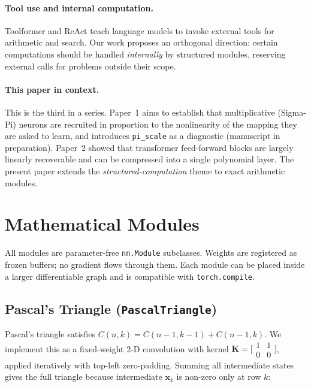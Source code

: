 \documentclass{article}
\begin{document}
\paragraph{Tool use and internal computation.}
Toolformer \citep{toolformer2023} and ReAct \citep{react2022} teach language models to
invoke external tools for arithmetic and search. Our work proposes an orthogonal
direction: certain computations should be handled \emph{internally} by structured
modules, reserving external calls for problems outside their scope.

\paragraph{This paper in context.}
This is the third in a series. Paper~1 \citep{paper1} aims to establish that multiplicative
(Sigma-Pi) neurons are recruited in proportion to the nonlinearity of the mapping they
are asked to learn, and introduces \texttt{pi\_scale} as a diagnostic (manuscript in
preparation). Paper~2
\citep{paper2} showed that transformer feed-forward blocks are largely linearly
recoverable and can be compressed into a single polynomial layer. The present paper
extends the \emph{structured-computation} theme to exact arithmetic modules.

\section{Mathematical Modules}
\label{sec:modules}

All modules are parameter-free \texttt{nn.Module} subclasses. Weights are registered
as frozen buffers; no gradient flows through them. Each module can be placed inside a
larger differentiable graph and is compatible with \texttt{torch.compile}.

\subsection{Pascal's Triangle (\texttt{PascalTriangle})}

Pascal's triangle satisfies $C(n,k) = C(n{-}1,k{-}1) + C(n{-}1,k)$.
We implement this as a fixed-weight 2-D convolution with kernel
$\mathbf{K} = \bigl[\begin{smallmatrix}1&1\\0&0\end{smallmatrix}\bigr]$,
applied iteratively with top-left zero-padding. Summing all intermediate states gives
the full triangle because intermediate $\mathbf{x}_k$ is non-zero only at row $k$:
\end{document}
